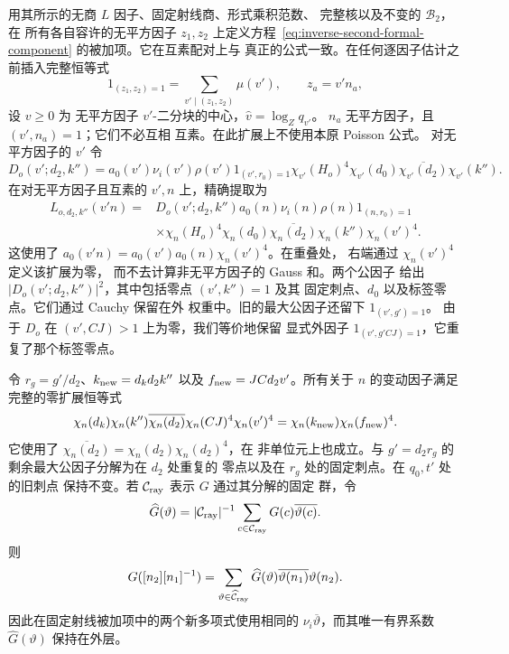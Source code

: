 用其所示的无商 \(L\) 因子、固定射线商、形式乘积范数、
完整核以及不变的 \(\mathcal B_2\)，在
所有各自容许的无平方因子 \(z_1,z_2\) 上定义方程~\eqref{eq:inverse-second-formal-component}
的被加项。它在互素配对上与
真正的公式一致。在任何逐因子估计之前插入完整恒等式
\[
 1_{(z_1,z_2)=1}=\sum_{v'\mid(z_1,z_2)}\mu(v'),\qquad z_a=v'n_a,
\]
设 \(v\ge0\) 为
无平方因子 \(v'\)-二分块的中心，\(\widehat v=\log_Zq_{v'}\)。
\(n_a\) 无平方因子，且 \((v',n_a)=1\)；它们不必互相
互素。在此扩展上不使用本原 Poisson 公式。
对无平方因子的 \(v'\) 令
\[
 D_o(v';d_2,k'')=a_0(v')\nu_i(v')\rho(v')1_{(v',r_0)=1}
   \chi_{v'}(H_o)^4\chi_{v'}(d_0)\overline{\chi_{v'}(d_2)}\chi_{v'}(k'').
\]
在对无平方因子且互素的 \(v',n\) 上，精确提取为
\begin{equation}\label{eq:inverse-second-extraction}
 \begin{split}
 L_{o,d_2,k''}(v'n)={}&D_o(v';d_2,k'')a_0(n)\nu_i(n)\rho(n)1_{(n,r_0)=1}\\
 &\times\chi_n(H_o)^4\chi_n(d_0)\overline{\chi_n(d_2)}
          \chi_n(k'')\chi_n(v')^4.
 \end{split}
\end{equation}
这使用了 \(a_0(v'n)=a_0(v')a_0(n)\chi_n(v')^4\)。在重叠处，
右端通过 \(\chi_n(v')^4\) 定义该扩展为零，
而不去计算非无平方因子的 Gauss 和。两个公因子
给出 \(|D_o(v';d_2,k'')|^2\)，其中包括零点 \((v',k'')=1\) 及其
固定刺点、\(d_0\) 以及标签零点。它们通过 Cauchy 保留在外
权重中。旧的最大公因子还留下 \(1_{(v',g')=1}\)。
由于 \(D_o\) 在 \((v',CJ)>1\) 上为零，我们等价地保留
显式外因子 \(1_{(v',g'CJ)=1}\)，它重复了那个标签零点。

令 \(r_g=g'/d_2\)、\(k_{\rm new}=d_kd_2k''\) 以及
\(f_{\rm new}=JCd_2v'\)。所有关于 \(n\) 的变动因子满足
完整的零扩展恒等式
\begin{equation}\label{eq:inverse-moving-characters}
 \chi_n(d_k)\chi_n(k'')\overline{\chi_n(d_2)}
       \chi_n(CJ)^4\chi_n(v')^4
 =\chi_n(k_{\rm new})\chi_n(f_{\rm new})^4.
\end{equation}
它使用了 \(\overline{\chi_n(d_2)}=\chi_n(d_2)\chi_n(d_2)^4\)，在
非单位元上也成立。与 \(g'=d_2r_g\) 的剩余最大公因子分解为在 \(d_2\) 处重复的
零点以及在 \(r_g\) 处的固定刺点。在 \(q_0,t'\) 处的旧刺点
保持不变。若 \(\mathcal C_{\rm ray}\) 表示 \(G\) 通过其分解的固定
群，令
\[
 \widehat G(\vartheta)=|\mathcal C_{\rm ray}|^{-1}
       \sum_{c\in\mathcal C_{\rm ray}}G(c)\overline{\vartheta(c)}.
\]
则
\[
 G([n_2][n_1]^{-1})=\sum_{\vartheta\in\widehat{\mathcal C}_{\rm ray}}
   \widehat G(\vartheta)\overline{\vartheta(n_1)}\vartheta(n_2).
\]
因此在固定射线被加项中的两个新多项式使用相同的
\(\nu_i\overline\vartheta\)，而其唯一有界系数
\(\widehat G(\vartheta)\) 保持在外层。

